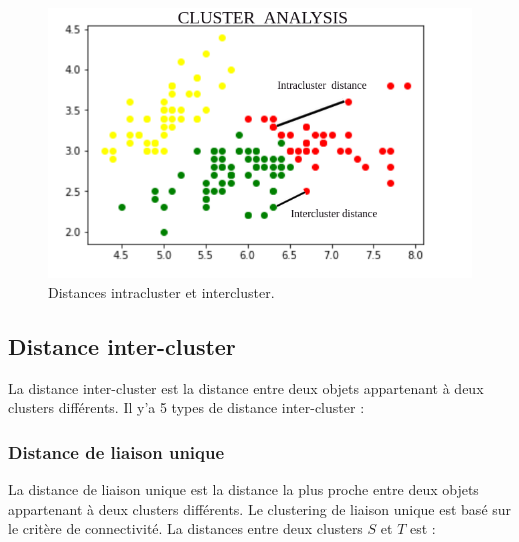 \begin{figure}[H]
	\begin{center}
		\includegraphics[width=\textwidth]{images/chapitre6/inter-intra_clusters__distnce.png}
	\end{center}
\caption{Distances intracluster et intercluster.}
\label{inter_intra_clusters}
\end{figure}

\subsection{Distance inter-cluster}
La distance inter-cluster est la distance entre deux objets appartenant à deux clusters différents. Il y’a 5 types de distance inter-cluster :

\subsubsection{Distance de liaison unique}
La distance de liaison unique est la distance la plus proche entre deux objets appartenant à deux clusters différents. Le clustering de liaison unique est basé sur le critère de connectivité. La distances entre deux clusters \(\displaystyle S \) et \(\displaystyle T \) est : \cite{maulik2002performance}


